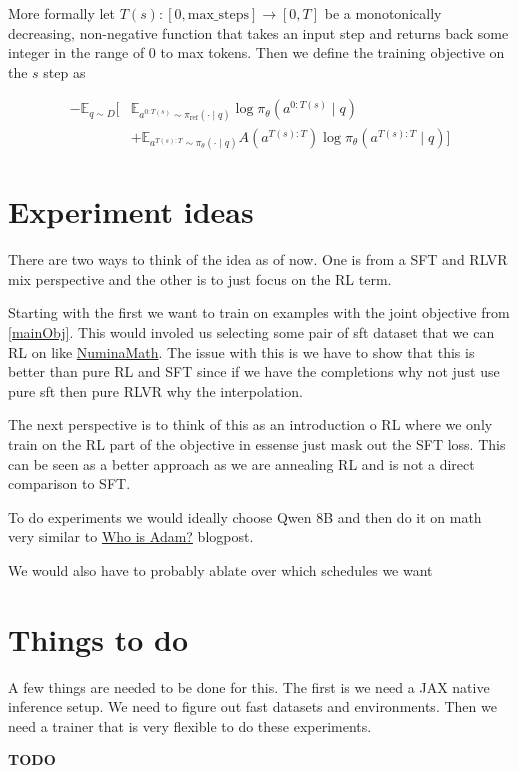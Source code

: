 \documentclass{article}
\begin{document}
More formally let $T(s): [0, \text{max\_steps}] \rightarrow [0, T]$  be a monotonically decreasing, non-negative function that takes an input step and returns back some integer in the range of 0 to max tokens. Then we define the training objective on the $s$ step as 

\begin{equation} \label{mainObj}
\begin{aligned}
- \mathbb{E}_{q \sim D} \Big[
&\mathbb{E}_{a^{0:T(s)} \sim \pi_{\text{ref}}(\cdot \mid q)}
\log \pi_\theta(a^{0 : T(s)} \mid q) \\
&+ \mathbb{E}_{a^{T(s): T} \sim \pi_\theta(\cdot \mid q)}
A(a^{T(s): T}) \log \pi_\theta(a^{T(s): T} \mid q)
\Big]
\end{aligned}
\end{equation}

\section{Experiment ideas}


There are two ways to think of the idea as of now. One is from a SFT and RLVR mix perspective and the other is to just focus on the RL term.

Starting with the first we want to train on examples with the joint objective from \ref{mainObj}. This would involed us selecting some pair of sft dataset that we can RL on like \href{https://huggingface.co/datasets/AI-MO/NuminaMath-CoT}{NuminaMath}. The issue with this is we have to show that this is better than pure RL and SFT since if we have the completions why not just use pure sft then pure RLVR why the interpolation. 

The next perspective is to think of this as an introduction o RL where we only train on the RL part of the objective in essense just mask out the SFT loss. This can be seen as a better approach as we are annealing RL and is not a direct comparison to SFT. 

To do experiments we would ideally choose Qwen 8B and then do it on math very similar to \href{https://www.notion.so/sagnikm/Who-is-Adam-SGD-Might-Be-All-We-Need-For-RLVR-In-LLMs-1cd2c74770c080de9cbbf74db14286b6}{Who is Adam?} blogpost. 

We would also have to probably ablate over which schedules we want 

\section{Things to do}

A few things are needed to be done for this. The first is we need a JAX native inference setup. We need to figure out fast datasets and environments. Then we need a trainer that is very flexible to do these experiments. 

\pagebreak 

\textbf{TODO} 
\end{document}
